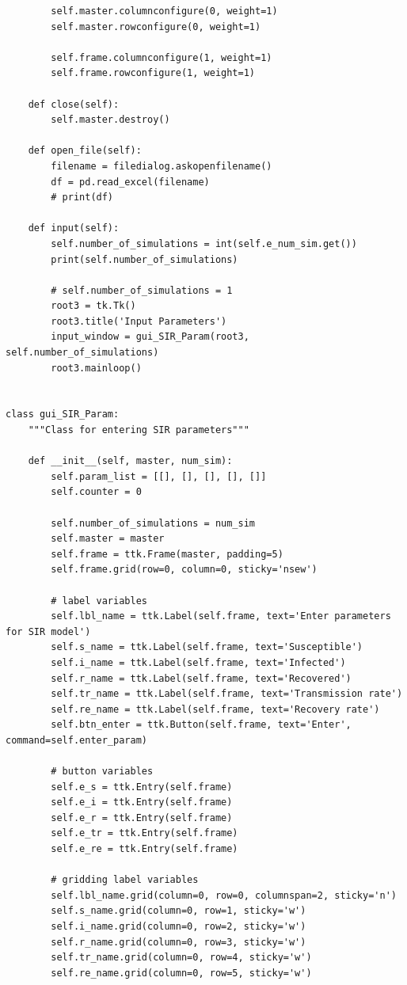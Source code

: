 \documentclass[11pt, a4paper]{article}
\begin{document}
\begin{lstlisting}
        self.master.columnconfigure(0, weight=1)
        self.master.rowconfigure(0, weight=1)

        self.frame.columnconfigure(1, weight=1)
        self.frame.rowconfigure(1, weight=1)

    def close(self):
        self.master.destroy()

    def open_file(self):
        filename = filedialog.askopenfilename()
        df = pd.read_excel(filename)
        # print(df)

    def input(self):
        self.number_of_simulations = int(self.e_num_sim.get())
        print(self.number_of_simulations)

        # self.number_of_simulations = 1
        root3 = tk.Tk()
        root3.title('Input Parameters')
        input_window = gui_SIR_Param(root3, self.number_of_simulations)
        root3.mainloop()


class gui_SIR_Param:
    """Class for entering SIR parameters"""

    def __init__(self, master, num_sim):
        self.param_list = [[], [], [], [], []]
        self.counter = 0

        self.number_of_simulations = num_sim
        self.master = master
        self.frame = ttk.Frame(master, padding=5)
        self.frame.grid(row=0, column=0, sticky='nsew')

        # label variables
        self.lbl_name = ttk.Label(self.frame, text='Enter parameters for SIR model')
        self.s_name = ttk.Label(self.frame, text='Susceptible')
        self.i_name = ttk.Label(self.frame, text='Infected')
        self.r_name = ttk.Label(self.frame, text='Recovered')
        self.tr_name = ttk.Label(self.frame, text='Transmission rate')
        self.re_name = ttk.Label(self.frame, text='Recovery rate')
        self.btn_enter = ttk.Button(self.frame, text='Enter', command=self.enter_param)

        # button variables
        self.e_s = ttk.Entry(self.frame)
        self.e_i = ttk.Entry(self.frame)
        self.e_r = ttk.Entry(self.frame)
        self.e_tr = ttk.Entry(self.frame)
        self.e_re = ttk.Entry(self.frame)

        # gridding label variables
        self.lbl_name.grid(column=0, row=0, columnspan=2, sticky='n')
        self.s_name.grid(column=0, row=1, sticky='w')
        self.i_name.grid(column=0, row=2, sticky='w')
        self.r_name.grid(column=0, row=3, sticky='w')
        self.tr_name.grid(column=0, row=4, sticky='w')
        self.re_name.grid(column=0, row=5, sticky='w')


\end{lstlisting}
\end{document}
